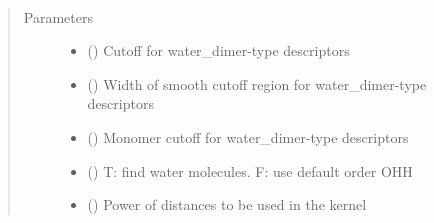 \documentclass[letterpaper,10pt,english]{sphinxmanual}
\begin{document}
\begin{fulllineitems}
\label{\detokenize{descriptors:gap.descriptors.water_dimer}}~\begin{quote}\begin{description}
\item[{Parameters}] \leavevmode\begin{itemize}
\item {} 
 () \textendash{} Cutoff for water\_dimer-type descriptors

\item {} 
 () \textendash{} Width of smooth cutoff region for water\_dimer-type descriptors

\item {} 
 () \textendash{} Monomer cutoff for water\_dimer-type descriptors

\item {} 
 () \textendash{} T: find water molecules. F: use default order OHH

\item {} 
 () \textendash{} Power of distances to be used in the kernel

\end{itemize}

\end{description}\end{quote}

\end{fulllineitems}

\end{document}

